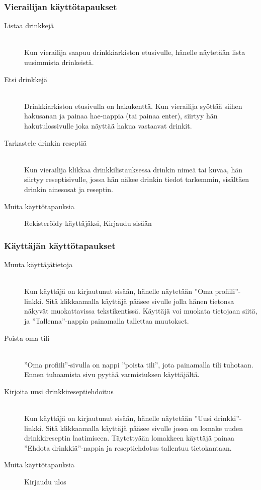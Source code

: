 \documentclass[a4paper]{article}
\begin{document}
\subsubsection{Vierailijan käyttötapaukset}
\begin{description}
  \item[Listaa drinkkejä] \hfill \\ Kun vierailija saapuu drinkkiarkiston etusivulle, hänelle näytetään lista uusimmista drinkeistä.
  \item[Etsi drinkkejä] \hfill \\ Drinkkiarkiston etusivulla on hakukenttä. Kun vierailija syöttää siihen hakusanan ja painaa hae-nappia (tai painaa enter), siirtyy hän hakutulossivulle joka näyttää hakua vastaavat drinkit.
  \item[Tarkastele drinkin reseptiä] \hfill \\ Kun vierailija klikkaa drinkkilistauksessa drinkin nimeä tai kuvaa, hän siirtyy reseptisivulle, jossa hän näkee drinkin tiedot tarkemmin, sisältäen drinkin ainesosat ja reseptin.
  \item[Muita käyttötapauksia] Rekisteröidy käyttäjäksi, Kirjaudu sisään
\end{description}

\subsubsection{Käyttäjän käyttötapaukset}
\begin{description}
  \item[Muuta käyttäjätietoja] \hfill \\ Kun käyttäjä on kirjautunut sisään, hänelle näytetään ''Oma profiili''-linkki. Sitä klikkaamalla käyttäjä pääsee sivulle jolla hänen tietonsa näkyvät muokattavissa tekstikentissä. Käyttäjä voi muokata tietojaan siitä, ja ''Tallenna''-nappia painamalla tallettaa muutokset.
  \item[Poista oma tili] \hfill \\ ''Oma profiili''-sivulla on nappi ''poista tili'', jota painamalla tili tuhotaan. Ennen tuhoamista sivu pyytää varmistuksen käyttäjältä.
  \item[Kirjoita uusi drinkkireseptiehdoitus] \hfill \\ Kun käyttäjä on kirjautunut sisään, hänelle näytetään ''Uusi drinkki''-linkki. Sitä klikkaamalla käyttäjä pääsee sivulle jossa on lomake uuden drinkkireseptin laatimiseen. Täytettyään lomakkeen käyttäjä painaa ''Ehdota drinkkiä''-nappia ja reseptiehdotus tallentuu tietokantaan.
  \item[Muita käyttötapauksia] Kirjaudu ulos
\end{description}
\end{document}
